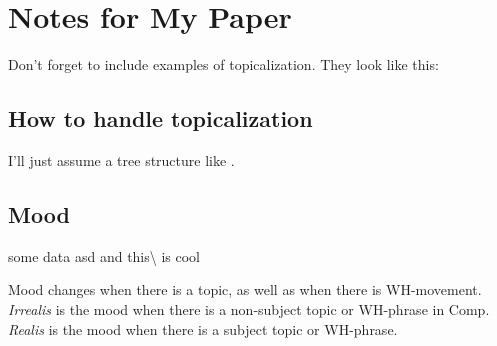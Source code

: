 \documentclass[12pt]{article}
\begin{document}
\section*{Notes for My Paper}

Don't forget to include examples of topicalization.
They look like this:

\subsection*{How to handle topicalization}

I'll just assume a tree structure like .

\subsection*{Mood}

some data asd  and this{\textbackslash} is cool

Mood changes when there is a topic, as well as when
there is WH-movement.  \emph{Irrealis} is the mood when
there is a non-subject topic or WH-phrase in Comp.
\emph{Realis} is the mood when there is a subject topic
or WH-phrase.


\end{document}
